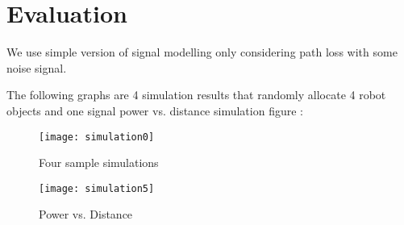 \section{Evaluation}
\label{sec:evaluation}
\label{Simulation Result}
\indent 
	We use simple version of signal modelling only considering path loss with some noise signal. 
\par 
	The following graphs are 4 simulation results that randomly allocate 4 robot objects and one signal power vs. distance simulation figure :\\
 
\begin{figure}[ht]
	\centering
	\texttt{[image: simulation0]}
	\caption{Four sample simulations}
	\end{figure}
	
\begin{figure}[ht]
	\centering
	\texttt{[image: simulation5]}
	\caption{Power vs. Distance}
	\end{figure}
	


